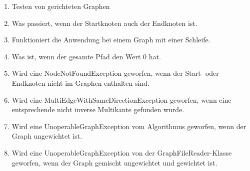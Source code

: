 \documentclass[a4paper]{article}
\begin{document}
\begin{enumerate}
    \item Testen von gerichteten Graphen
    \item Was passiert, wenn der Startknoten auch der Endknoten ist.
    \item Funktioniert die Anwendung bei einem Graph mit einer Schleife.
    \item Was ist, wenn der gesamte Pfad den Wert 0 hat.
    \item Wird eine NodeNotFoundException geworfen, wenn der Start- oder Endknoten nicht im Graphen enthalten sind.
    \item Wird eine MultiEdgeWithSameDirectionException geworfen, wenn eine entsprechende nicht inverse Multikante gefunden wurde.
    \item Wird eine UnoperableGraphException vom Algorithmus geworfen, wenn der Graph ungewichtet ist.
    \item Wird eine UnoperableGraphException von der GraphFileReader-Klasse geworfen, wenn der Graph gemischt ungewichtet und gewichtet ist.
\end{enumerate}
\end{document}
